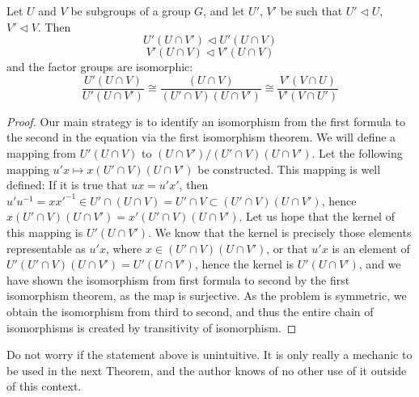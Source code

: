 \begin{theorem}  
    Let $U$ and $V$ be subgroups of a group $G$, and let $U'$, $V'$ be such that $U' \lhd U$, $V' \lhd V$. Then
    \[ U'(U \cap V') \lhd U'(U \cap V) \]
    \[ V'(U \cap V) \lhd V'(U \cap V) \]
    and the factor groups are isomorphic:
    \[ \frac{U'(U \cap V)}{U'(U \cap V')} \cong \frac{(U \cap V)}{(U' \cap V)(U \cap V')} \cong \frac{V'(V \cap U)}{V'(V \cap U')} \]
\end{theorem}
\begin{proof}
    Our main strategy is to identify an isomorphism from the first formula to the second in the equation via the first isomorphism theorem. We will define a mapping from $U'(U \cap V)$ to $(U \cap V')/(U' \cap V)(U \cap V')$. Let the following mapping $u'x \mapsto x(U' \cap V)(U \cap V')$ be constructed. This mapping is well defined: If it is true that $ux = u'x'$, then $u'u^{-1} = xx'^{-1} \in U' \cap (U \cap V) = U' \cap V \subset (U' \cap V)(U \cap V')$, hence $x(U' \cap V)(U \cap V') = x'(U' \cap V)(U \cap V')$. Let us hope that the kernel of this mapping is $U'(U \cap V')$. We know that the kernel is precisely those elements representable as $u'x$, where $x \in (U' \cap V)(U \cap V')$, or that $u'x$ is an element of $U'(U' \cap V)(U \cap V') = U'(U \cap V')$, hence the kernel is $U'(U \cap V')$, and we have shown the isomorphism from first formula to second by the first isomorphism theorem, as the map is surjective. As the problem is symmetric, we obtain the isomorphism from third to second, and thus the entire chain of isomorphisms is created by transitivity of isomorphism.
\end{proof}

Do not worry if the statement above is unintuitive. It is only really a mechanic to be used in the next Theorem, and the author knows of no other use of it outside of this context.

